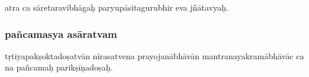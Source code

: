 \documentclass[12pt]{article}
\begin{document}
atra ca sāretaravibhāgaḥ paryupāsitagurubhir eva jñātavyaḥ.

% 

\subsubsection{pañcamasya asāratvam}
\noindent tṛtīyapakṣoktadoṣatvān nīrasatvena\footnoteB{
	nīrasatvena] \conj ; nīrasatvena te \MS\ \EDD
} prayojanābhāvān mantranayakramābhāvāc ca na pañcamaḥ parikṣīṇadoṣaḥ.
\end{document}
